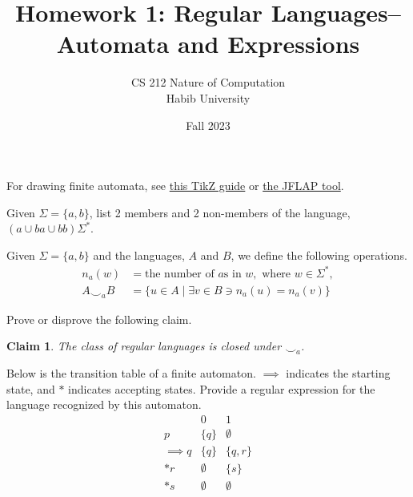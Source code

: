 \documentclass[addpoints]{exam}
\title{Homework 1: Regular Languages--Automata and Expressions}
\author{CS 212 Nature of Computation\\Habib University}
\date{Fall 2023}
\theoremstyle{claim}
\newtheorem{claim}{Claim}
\begin{document}
\maketitle



For drawing finite automata, see  \href{https://www3.nd.edu/~kogge/courses/cse30151-fa17/Public/other/tikz_tutorial.pdf}{this TikZ guide} or \href{https://www.jflap.org}{the JFLAP tool}.

\begin{questions}

\question Given $\Sigma=\{a,b\}$, list 2 members and 2 non-members of the language, $(a \cup ba \cup bb)\Sigma^*$.

\question Given $\Sigma=\{a,b\}$ and the languages, $A$ and $B$, we define the following operations.
  \begin{align*}
    n_a(w) &=  \text{the number of } a\text{s in } w, \text{ where } w\in\Sigma^*,\\
    A\smile_a B &= \{ u\in A \mid \exists v\in B \ni n_a(u) = n_a(v) \}
  \end{align*}

  Prove or disprove the following claim.
  \begin{claim}
    The class of regular languages is closed under $\smile_a$.
  \end{claim}

  
\question[5] Below is the transition table of a finite automaton. $\implies$ indicates the starting state, and $*$ indicates accepting states. Provide a regular expression for the language recognized by this automaton.
  \[
  \begin{array}{r|cc}
    & 0 & 1 \\\hline
    p & \{ q \} & \emptyset \\
    \implies q & \{ q \} & \{ q, r \} \\
    *r & \emptyset & \{ s \} \\
    *s & \emptyset & \emptyset \\
  \end{array}
  \]
  
\question
\end{questions}
\end{document}
